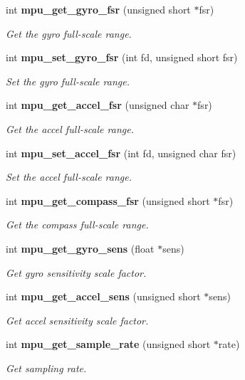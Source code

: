 \begin{DoxyCompactItemize}
int \textbf{ mpu\+\_\+get\+\_\+gyro\+\_\+fsr} (unsigned short $\ast$fsr)
\begin{DoxyCompactList}\small\item\em Get the gyro full-\/scale range. \end{DoxyCompactList}\item 
int \textbf{ mpu\+\_\+set\+\_\+gyro\+\_\+fsr} (int fd, unsigned short fsr)
\begin{DoxyCompactList}\small\item\em Set the gyro full-\/scale range. \end{DoxyCompactList}\item 
int \textbf{ mpu\+\_\+get\+\_\+accel\+\_\+fsr} (unsigned char $\ast$fsr)
\begin{DoxyCompactList}\small\item\em Get the accel full-\/scale range. \end{DoxyCompactList}\item 
int \textbf{ mpu\+\_\+set\+\_\+accel\+\_\+fsr} (int fd, unsigned char fsr)
\begin{DoxyCompactList}\small\item\em Set the accel full-\/scale range. \end{DoxyCompactList}\item 
int \textbf{ mpu\+\_\+get\+\_\+compass\+\_\+fsr} (unsigned short $\ast$fsr)
\begin{DoxyCompactList}\small\item\em Get the compass full-\/scale range. \end{DoxyCompactList}\item 
int \textbf{ mpu\+\_\+get\+\_\+gyro\+\_\+sens} (float $\ast$sens)
\begin{DoxyCompactList}\small\item\em Get gyro sensitivity scale factor. \end{DoxyCompactList}\item 
int \textbf{ mpu\+\_\+get\+\_\+accel\+\_\+sens} (unsigned short $\ast$sens)
\begin{DoxyCompactList}\small\item\em Get accel sensitivity scale factor. \end{DoxyCompactList}\item 
int \textbf{ mpu\+\_\+get\+\_\+sample\+\_\+rate} (unsigned short $\ast$rate)
\begin{DoxyCompactList}\small\item\em Get sampling rate. \end{DoxyCompactList}\item 

\end{DoxyCompactItemize}
